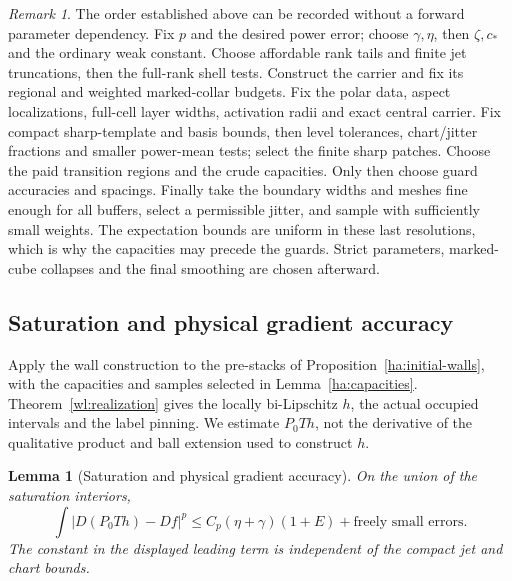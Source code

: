 \documentclass[11pt]{article}
\numberwithin{equation}{section}
\newtheorem{lemma}[theorem]{Lemma}
\theoremstyle{definition}
\theoremstyle{remark}
\newtheorem{remark}[theorem]{Remark}
\begin{document}
\begin{remark}\label{ha:scale-order}
The order established above can be recorded without a forward
parameter dependency.  Fix $p$ and the desired power error; choose
$\gamma,\eta$, then $\zeta,c_*$ and the ordinary weak constant.
Choose affordable rank tails and finite jet truncations, then the
full-rank shell tests.  Construct the carrier and fix its regional
and weighted marked-collar budgets.  Fix the polar data, aspect
localizations, full-cell layer widths, activation radii and exact
central carrier.  Fix compact sharp-template and basis bounds,
then level tolerances, chart/jitter fractions and smaller
power-mean tests; select the finite sharp patches.  Choose the paid
transition regions and the crude capacities.  Only then choose
guard accuracies and spacings.  Finally take the boundary widths
and meshes fine enough for all buffers, select a permissible
jitter, and sample with sufficiently small weights.  The expectation
bounds are uniform in these last resolutions, which is why the
capacities may precede the guards.  Strict parameters, marked-cube
collapses and the final smoothing are chosen afterward.
\end{remark}

\subsection{Saturation and physical gradient accuracy}
\label{ha:saturation-subsection}

Apply the wall construction to the pre-stacks of
Proposition~\ref{ha:initial-walls}, with the capacities and samples
selected in Lemma~\ref{ha:capacities}.  Theorem~\ref{wl:realization} gives the
locally bi-Lipschitz $h$, the actual occupied intervals and the
label pinning.  We estimate $P_0Th$, not the derivative of the
qualitative product and ball extension used to construct $h$.

\begin{lemma}[Saturation and physical gradient accuracy]\label{ha:saturation}
On the union of the saturation interiors,
\begin{equation}\label{ha:physical-saturation}
 \int |D(P_0Th)-Df|^p
       \le C_p(\eta+\gamma)(1+E)
                         +\text{freely small errors}.
\end{equation}
The constant in the displayed leading term is independent of the
compact jet and chart bounds.
\end{lemma}
\end{document}
